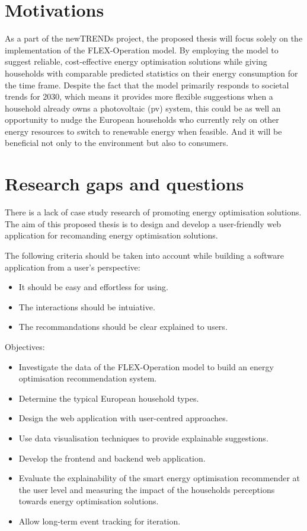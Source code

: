 \section{Motivations}

As a part of the newTRENDs project, 
the proposed thesis will focus solely on the implementation of the FLEX-Operation model.  
By employing the model to 
suggest reliable, cost-effective energy optimisation solutions 
while giving households with comparable predicted statistics on their energy consumption for the time frame. 
Despite the fact that the model primarily responds to societal trends for 2030, 
which means it provides more flexible suggestions when a household already owns a photovoltaic (\gls{pv}) system, 
this could be as well an opportunity to nudge the European households who currently rely on other energy resources
to switch to renewable energy when feasible. 
And it will be beneficial not only to the environment but also to consumers. 

\section{Research gaps and questions}

There is a lack of case study research of promoting energy optimisation solutions. 
The aim of this proposed thesis is to design and develop a user-friendly web application for recomanding energy optimisation solutions.

The following criteria should be taken into account while building a software application from a user's perspective: 

\begin{itemize}
  \item It should be easy and effortless for using. 
  \item The interactions should be intuiative. 
  \item The recommandations should be clear explained to users. 
\end{itemize}

Objectives: 

\begin{itemize}
  \item Investigate the data of the FLEX-Operation model to build an energy optimisation recommendation system.
  \item Determine the typical European household types. 
  \item Design the web application with user-centred approaches. 
  \item Use data visualisation techniques to provide explainable suggestions. 
  \item Develop the frontend and backend web application. 
  \item Evaluate the explainability of the smart energy optimisation recommender at the user level and measuring the impact of the households perceptions towards energy optimisation solutions. 
  \item Allow long-term event tracking for iteration. 
\end{itemize}

